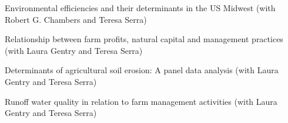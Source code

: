 
Environmental efficiencies and their determinants in the US Midwest (with Robert G. Chambers and Teresa Serra)
    
Relationship between farm profits, natural capital and management practices (with Laura Gentry and Teresa Serra)
    
Determinants of agricultural soil erosion: A panel data analysis (with Laura Gentry and Teresa Serra)
    
Runoff water quality in relation to farm management activities (with Laura Gentry and Teresa Serra)